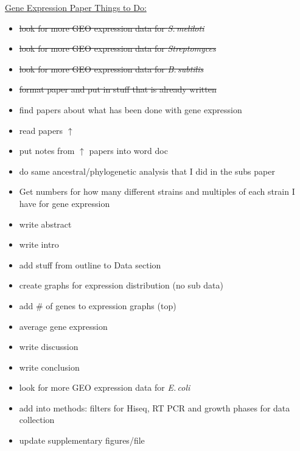 \documentclass[12pt]{article}
\newcommand{\smel}{\textit{S.\,meliloti}\xspace}
\newcommand{\strep}{\textit{Streptomyces}\xspace}
\newcommand{\bass}{\textit{B.\,subtilis}\xspace}
\newcommand{\ecol}{\textit{E.\,coli}\xspace}
\begin{document}
\underline{Gene Expression Paper Things to Do:}
\begin{itemize}
	
	\item \sout{look for more GEO expression data for \smel}
	
	\item \sout{look for more GEO expression data for \strep}
	
	\item \sout{look for more GEO expression data for \bass}
	
	\item \sout{format paper and put in stuff that is already written}
	
	\item find papers about what has been done with gene expression
	
	\item read papers $\uparrow$
	
	\item put notes from $\uparrow$ papers into word doc
	
	\item do same ancestral/phylogenetic analysis that I did in the subs paper 
	
	\item Get numbers for how many different strains and multiples of each strain I have for gene expression
	
	\item write abstract
	
	\item write intro
	
	\item add stuff from outline to Data section
	
	\item create graphs for expression distribution (no sub data)
	
	\item add \# of genes to expression graphs (top)
	
	\item average gene expression
	
	\item write discussion
	
	\item write conclusion
	
	\item look for more GEO expression data for \ecol
	
	\item add into methods: filters for Hiseq, RT PCR and growth phases for data collection
	
	\item update supplementary figures/file
	
\end{itemize}
\end{document}
